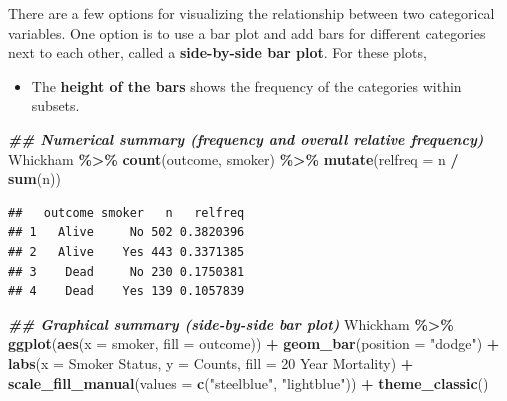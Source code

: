 \documentclass[
]{book}
\newenvironment{Shaded}{\begin{snugshade}}{\end{snugshade}}
\newcommand{\AttributeTok}[1]{\textcolor[rgb]{0.13,0.29,0.53}{#1}}
\newcommand{\DocumentationTok}[1]{\textcolor[rgb]{0.56,0.35,0.01}{\textbf{\textit{#1}}}}
\newcommand{\FunctionTok}[1]{\textcolor[rgb]{0.13,0.29,0.53}{\textbf{#1}}}
\newcommand{\NormalTok}[1]{#1}
\newcommand{\SpecialCharTok}[1]{\textcolor[rgb]{0.81,0.36,0.00}{\textbf{#1}}}
\newcommand{\StringTok}[1]{\textcolor[rgb]{0.31,0.60,0.02}{#1}}
\providecommand{\tightlist}{%
  \setlength{\itemsep}{0pt}\setlength{\parskip}{0pt}}
\begin{document}
There are a few options for visualizing the relationship between two categorical variables. One option is to use a bar plot and add bars for different categories next to each other, called a \textbf{side-by-side bar plot}. For these plots,

\begin{itemize}
\tightlist
\item
  The \textbf{height of the bars} shows the frequency of the categories within subsets.
\end{itemize}

\begin{Shaded}
\begin{Highlighting}[]
\DocumentationTok{\#\# Numerical summary (frequency and overall relative frequency)}
\NormalTok{Whickham }\SpecialCharTok{\%\textgreater{}\%}
  \FunctionTok{count}\NormalTok{(outcome, smoker) }\SpecialCharTok{\%\textgreater{}\%}
  \FunctionTok{mutate}\NormalTok{(}\AttributeTok{relfreq =}\NormalTok{ n }\SpecialCharTok{/} \FunctionTok{sum}\NormalTok{(n))}
\end{Highlighting}
\end{Shaded}

\begin{verbatim}
##   outcome smoker   n   relfreq
## 1   Alive     No 502 0.3820396
## 2   Alive    Yes 443 0.3371385
## 3    Dead     No 230 0.1750381
## 4    Dead    Yes 139 0.1057839
\end{verbatim}

\begin{Shaded}
\begin{Highlighting}[]
\DocumentationTok{\#\# Graphical summary (side{-}by{-}side bar plot)}
\NormalTok{Whickham }\SpecialCharTok{\%\textgreater{}\%}
  \FunctionTok{ggplot}\NormalTok{(}\FunctionTok{aes}\NormalTok{(}\AttributeTok{x =}\NormalTok{ smoker, }\AttributeTok{fill =}\NormalTok{ outcome)) }\SpecialCharTok{+} 
  \FunctionTok{geom\_bar}\NormalTok{(}\AttributeTok{position =} \StringTok{"dodge"}\NormalTok{) }\SpecialCharTok{+}
  \FunctionTok{labs}\NormalTok{(}\AttributeTok{x =} \StringTok{\textquotesingle{}Smoker Status\textquotesingle{}}\NormalTok{, }\AttributeTok{y =} \StringTok{\textquotesingle{}Counts\textquotesingle{}}\NormalTok{, }\AttributeTok{fill =} \StringTok{\textquotesingle{}20 Year Mortality\textquotesingle{}}\NormalTok{) }\SpecialCharTok{+} 
  \FunctionTok{scale\_fill\_manual}\NormalTok{(}\AttributeTok{values =} \FunctionTok{c}\NormalTok{(}\StringTok{"steelblue"}\NormalTok{, }\StringTok{"lightblue"}\NormalTok{)) }\SpecialCharTok{+} 
  \FunctionTok{theme\_classic}\NormalTok{()}
\end{Highlighting}
\end{Shaded}
\end{document}
